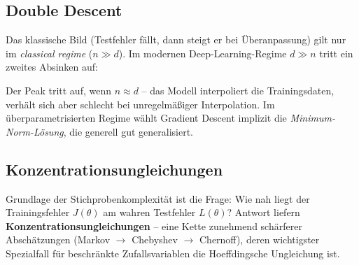 \documentclass[11pt]{article}
\theoremstyle{csthm}
\theoremstyle{csdef}
\begin{document}
\subsection{Double Descent}

Das klassische Bild (Testfehler fällt, dann steigt er bei Überanpassung) gilt
nur im \emph{classical regime} ($n \gg d$). Im modernen Deep-Learning-Regime
$d \gg n$ tritt ein zweites Absinken auf:

\begin{center}
\end{center}

Der Peak tritt auf, wenn $n \approx d$ -- das Modell interpoliert die
Trainingsdaten, verhält sich aber schlecht bei unregelmäßiger Interpolation.
Im überparametrisierten Regime wählt Gradient Descent implizit die
\emph{Minimum-Norm-Lösung}, die generell gut generalisiert.

\subsection{Konzentrationsungleichungen}

Grundlage der Stichprobenkomplexität ist die Frage: Wie nah liegt der
Trainingsfehler $J(\theta)$ am wahren Testfehler $L(\theta)$? Antwort liefern
\textbf{Konzentrationsungleichungen} -- eine Kette zunehmend schärferer
Abschätzungen (Markov $\to$ Chebyshev $\to$ Chernoff), deren wichtigster
Spezialfall für beschränkte Zufallsvariablen die Hoeffdingsche Ungleichung
ist.
\end{document}
